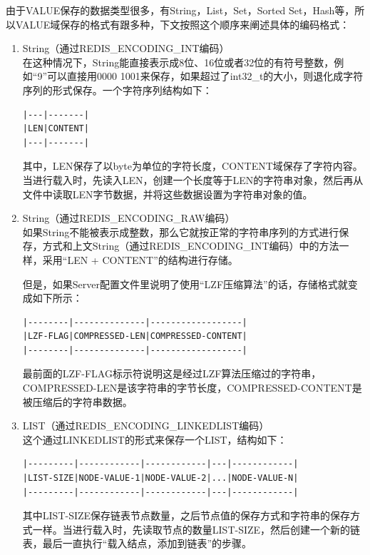 \documentclass{zjutthesis}
\begin{document}
由于VALUE保存的数据类型很多，有String，List，Set，Sorted Set，Hash等，所以VALUE域保存的格式有跟多种，下文按照这个顺序来阐述具体的编码格式：
\begin{enumerate}[label=\arabic*.]

\item{
String（通过REDIS\_ENCODING\_INT编码）\\
在这种情况下，String能直接表示成8位、16位或者32位的有符号整数，例如“9”可以直接用0000 1001来保存，如果超过了int32\_t的大小，则退化成字符序列的形式保存。一个字符序列结构如下：
\begin{verbatim}
|---|-------|
|LEN|CONTENT|
|---|-------|
\end{verbatim}
其中，LEN保存了以byte为单位的字符长度，CONTENT域保存了字符内容。
当进行载入时，先读入LEN，创建一个长度等于LEN的字符串对象，然后再从文件中读取LEN字节数据，并将这些数据设置为字符串对象的值。
}

\item{
String（通过REDIS\_ENCODING\_RAW编码）\\
如果String不能被表示成整数，那么它就按正常的字符串序列的方式进行保存，方式和上文String（通过REDIS\_ENCODING\_INT编码）中的方法一样，采用“LEN + CONTENT”的结构进行存储。

但是，如果Server配置文件里说明了使用“LZF压缩算法”的话，存储格式就变成如下所示：
\begin{verbatim}
|--------|--------------|------------------|
|LZF-FLAG|COMPRESSED-LEN|COMPRESSED-CONTENT|
|--------|--------------|------------------|
\end{verbatim}
最前面的LZF-FLAG标示符说明这是经过LZF算法\cite{web:LibLZF}压缩过的字符串，COMPRESSED-LEN是该字符串的字节长度，COMPRESSED-CONTENT是被压缩后的字符串数据。
}

\item{
LIST（通过REDIS\_ENCODING\_LINKEDLIST编码）\\
这个通过LINKEDLIST的形式来保存一个LIST，结构如下：
\begin{verbatim}
|---------|------------|------------|---|------------|
|LIST-SIZE|NODE-VALUE-1|NODE-VALUE-2|...|NODE-VALUE-N|
|---------|------------|------------|---|------------|
\end{verbatim}
其中LIST-SIZE保存链表节点数量，之后节点值的保存方式和字符串的保存方式一样。当进行载入时，先读取节点的数量LIST-SIZE，然后创建一个新的链表，最后一直执行“载入结点，添加到链表”的步骤。
}


\end{enumerate}
\end{document}
